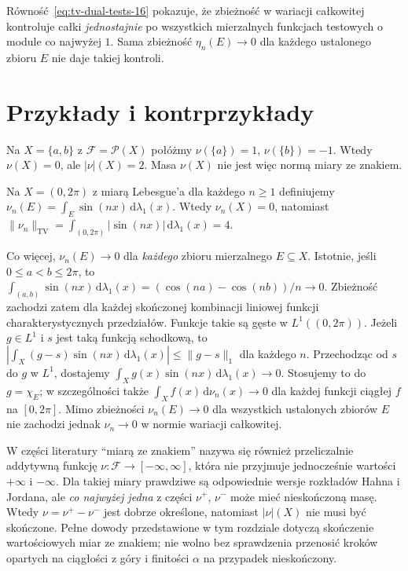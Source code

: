 \begin{uwaga}
Równość~\eqref{eq:tv-dual-tests-16} pokazuje, że zbieżność
w wariacji całkowitej kontroluje całki \emph{jednostajnie}
po wszystkich mierzalnych funkcjach testowych o module
co najwyżej $1$. Sama zbieżność $\eta_n(E)\to0$ dla
każdego ustalonego zbioru $E$ nie daje takiej kontroli.
\end{uwaga}

\section{Przykłady i kontrprzykłady}
\begin{przyklad}
Na $X=\{a,b\}$ z $\mathcal F=\mathcal P(X)$ połóżmy
$\nu(\{a\})=1$, $\nu(\{b\})=-1$. Wtedy
$\nu(X)=0$, ale $|\nu|(X)=2$.
Masa $\nu(X)$ nie jest więc normą miary ze znakiem.
\end{przyklad}

\begin{przyklad}
Na $X=(0,2\pi)$ z miarą Lebesgue'a dla każdego $n\ge1$
definiujemy $\nu_n(E)=\int_E\sin(nx)\,\mathrm d\lambda_1(x)$.
Wtedy $\nu_n(X)=0$, natomiast
$\|\nu_n\|_{\mathrm{TV}}=
\int_{(0,2\pi)}|\sin(nx)|\,\mathrm d\lambda_1(x)=4$.

Co więcej, $\nu_n(E)\to0$ dla \emph{każdego}
zbioru mierzalnego $E\subseteq X$. Istotnie, jeśli
$0\le a<b\le2\pi$, to
$\int_{(a,b)}\sin(nx)\,\mathrm d\lambda_1(x)
=(\cos(na)-\cos(nb))/n\to0$.
Zbieżność zachodzi zatem dla każdej skończonej
kombinacji liniowej funkcji charakterystycznych przedziałów.
Funkcje takie są gęste w $L^1((0,2\pi))$.
Jeżeli $g\in L^1$ i $s$ jest taką funkcją schodkową, to
$\left|\int_X(g-s)\sin(nx)\,\mathrm d\lambda_1(x)\right|
\le\|g-s\|_1$ dla każdego $n$.
Przechodząc od $s$ do $g$ w $L^1$, dostajemy
$\int_Xg(x)\sin(nx)\,\mathrm d\lambda_1(x)\to0$.
Stosujemy to do $g=\chi_E$; w szczególności także
$\int_X f(x)\,\mathrm d\nu_n(x)\to0$ dla każdej
funkcji ciągłej $f$ na $[0,2\pi]$.
Mimo zbieżności $\nu_n(E)\to0$ dla wszystkich
ustalonych zbiorów $E$ nie zachodzi jednak
$\nu_n\to0$ w normie wariacji całkowitej.
\end{przyklad}

\begin{uwaga}
W części literatury ``miarą ze znakiem'' nazywa się
również przeliczalnie addytywną funkcję
$\nu:\mathcal F\to[-\infty,\infty]$, która nie przyjmuje
jednocześnie wartości $+\infty$ i $-\infty$.
Dla takiej miary prawdziwe są odpowiednie wersje
rozkładów Hahna i Jordana, ale \emph{co najwyżej jedna}
z części $\nu^+$, $\nu^-$ może mieć nieskończoną masę.
Wtedy $\nu=\nu^+-\nu^-$ jest dobrze określone,
natomiast $|\nu|(X)$ nie musi być skończone.
Pełne dowody przedstawione w tym rozdziale dotyczą
skończenie wartościowych miar ze znakiem; nie wolno
bez sprawdzenia przenosić kroków opartych na
ciągłości z góry i finitości $\alpha$ na przypadek
nieskończony.
\end{uwaga}
